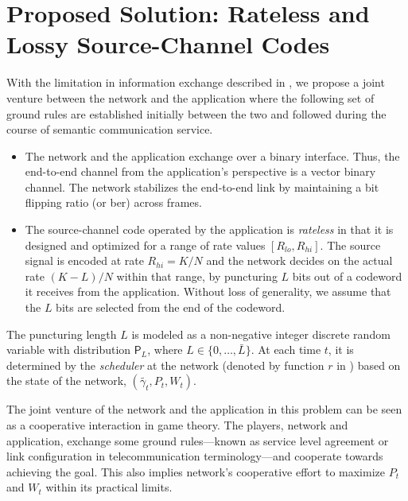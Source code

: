 
\section{Proposed Solution: Rateless and Lossy Source-Channel Codes}
\label{sec:proposal}

With the limitation in information exchange described in , we propose a joint venture between the network and the application where the following  set of ground rules are established initially between the two and followed during the course of semantic communication service. 
\begin{itemize}
    \item The network and the application exchange over a binary  interface. Thus, the end-to-end channel from the application's perspective is a vector binary channel. The network stabilizes the end-to-end  link by maintaining a bit flipping ratio (or \gls{ber}) across frames. 
    \item The source-channel code operated by the application is \emph{rateless} in that it is designed and optimized for a %
    range of rate values $[R_{lo}, R_{hi}]$. The source signal is  encoded at rate $R_{hi} = K/N$ and the network decides on the actual rate $(K-L)/N$ within that range, by puncturing $L$ bits out of a codeword it receives from the application. Without loss of generality, we assume that the $L$ bits are selected from the end of the codeword.
\end{itemize}

The puncturing length $L$ is modeled as a non-negative integer discrete random variable with distribution $\mathsf{P}_L$, where $L \in \{0, \ldots, \bar{L}\}$. At each time $t$, it is determined by the \emph{scheduler} at the network (denoted by function $r$ in ) based on the state of the network, $(\tilde{\gamma_t},P_t,W_t)$.

\begin{remark}
    The joint venture of the network and the application in this problem can be seen as a cooperative interaction in game theory. The players, network and application, exchange some ground rules---known as service level agreement or link configuration in telecommunication terminology---and cooperate towards achieving the goal. This also implies network's cooperative effort to maximize $P_t$ and $W_t$ within its practical limits.
\end{remark}


